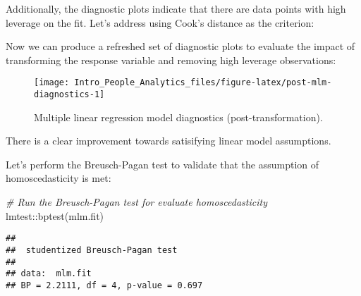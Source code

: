 \documentclass[
]{book}
\newenvironment{Shaded}{\begin{snugshade}}{\end{snugshade}}
\newcommand{\AttributeTok}[1]{\textcolor[rgb]{0.77,0.63,0.00}{#1}}
\newcommand{\CommentTok}[1]{\textcolor[rgb]{0.56,0.35,0.01}{\textit{#1}}}
\newcommand{\DecValTok}[1]{\textcolor[rgb]{0.00,0.00,0.81}{#1}}
\newcommand{\FunctionTok}[1]{\textcolor[rgb]{0.00,0.00,0.00}{#1}}
\newcommand{\NormalTok}[1]{#1}
\newcommand{\OtherTok}[1]{\textcolor[rgb]{0.56,0.35,0.01}{#1}}
\newcommand{\SpecialCharTok}[1]{\textcolor[rgb]{0.00,0.00,0.00}{#1}}
\begin{document}
Additionally, the diagnostic plots indicate that there are data points with high leverage on the fit. Let's address using Cook's distance as the criterion:

\begin{Shaded}
\end{Shaded}

Now we can produce a refreshed set of diagnostic plots to evaluate the impact of transforming the response variable and removing high leverage observations:

\begin{figure}

{\centering \texttt{[image: Intro\_People\_Analytics\_files/figure-latex/post-mlm-diagnostics-1]} 

}

\caption{Multiple linear regression model diagnostics (post-transformation).}\label{fig:post-mlm-diagnostics}
\end{figure}

There is a clear improvement towards satisifying linear model assumptions.

Let's perform the Breusch-Pagan test to validate that the assumption of homoscedasticity is met:

\begin{Shaded}
\begin{Highlighting}[]
\CommentTok{\# Run the Breusch{-}Pagan test for evaluate homoscedasticity}
\NormalTok{lmtest}\SpecialCharTok{::}\FunctionTok{bptest}\NormalTok{(mlm.fit)}
\end{Highlighting}
\end{Shaded}

\begin{verbatim}
## 
##  studentized Breusch-Pagan test
## 
## data:  mlm.fit
## BP = 2.2111, df = 4, p-value = 0.697
\end{verbatim}
\end{document}
